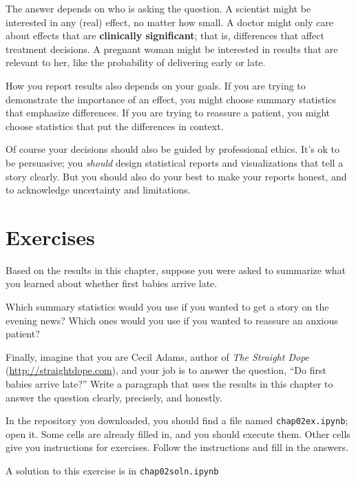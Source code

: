 \documentclass[12pt]{book}
\begin{document}
The answer depends on who is asking the question.  A scientist might
be interested in any (real) effect, no matter how small.  A doctor
might only care about effects that are {\bf clinically significant};
that is, differences that affect treatment decisions.  A pregnant
woman might be interested in results that are relevant to her, like
the probability of delivering early or late.
 

How you report results also depends on your goals.  If you are trying
to demonstrate the importance of an effect, you might choose summary
statistics that emphasize differences.  If you are trying to reassure
a patient, you might choose statistics that put the differences in
context.

Of course your decisions should also be guided by professional ethics.
It's ok to be persuasive; you {\em should} design statistical reports
and visualizations that tell a story clearly.  But you should also do
your best to make your reports honest, and to acknowledge uncertainty
and limitations.


\section{Exercises}

\begin{exercise}
Based on the results in this chapter, suppose you were asked to
summarize what you learned about whether first babies arrive late.

Which summary statistics would you use if you wanted to get a story
on the evening news?  Which ones would you use if you wanted to
reassure an anxious patient?

Finally, imagine that you are Cecil Adams, author of {\it The Straight
  Dope} (\url{http://straightdope.com}), and your job is to answer the
question, ``Do first babies arrive late?''  Write a paragraph that
uses the results in this chapter to answer the question clearly,
precisely, and honestly.

\end{exercise}

\begin{exercise}
In the repository you downloaded, you should find a file named
\verb"chap02ex.ipynb"; open it.  Some cells are already filled in, and
you should execute them.  Other cells give you instructions for
exercises.  Follow the instructions and fill in the answers.

A solution to this exercise is in \verb"chap02soln.ipynb"
\end{exercise}
\end{document}
